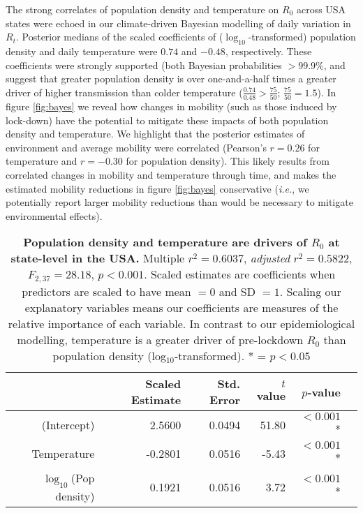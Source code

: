 \documentclass[12pt,english,a4paper]{article}
\newcommand{\RO}{$R_0$\xspace}
\begin{document}
The strong correlates of population density and temperature on \RO across USA states were echoed in our climate-driven Bayesian modelling of daily variation in $R_t$. Posterior medians of the scaled coefficients of ($\log_{10}$-transformed) population density and daily temperature were $0.74$ and $-0.48$, respectively. These coefficients were strongly supported (both Bayesian probabilities $> 99.9\%$, and suggest that greater population density is over one-and-a-half times a greater driver of higher transmission than colder temperature ($\frac{0.74}{0.48} > \frac{75}{50}$; $\frac{75}{50} = 1.5$). 
In figure \ref{fig:bayes} we reveal how changes in mobility (such as those induced by lock-down) have the potential to mitigate these impacts of both population density and temperature.
We highlight that the posterior estimates of environment and average mobility were correlated (Pearson's $r = 0.26$ for temperature and $r = -0.30$ for population density). 
This likely results from correlated changes in mobility and temperature through time, and makes the estimated mobility reductions in figure \ref{fig:bayes} conservative (\emph{i.e.}, we potentially report larger mobility reductions than would be necessary to mitigate environmental effects).



\begin{table}[ht]
\centering
\caption{\textbf{Population density and temperature are drivers of \RO at state-level in the USA.} Multiple $r^2 = 0.6037$, \textsl{adjusted} $r^2 = 0.5822$, $F_{2,37} = 28.18$, $p < 0.001$. Scaled estimates are coefficients when predictors are scaled to have mean $= 0$ and SD $= 1$. Scaling our explanatory variables means our coefficients are measures of the relative importance of each variable. In contrast to our epidemiological modelling, temperature is a greater driver of pre-lockdown \RO than population density (log$_{10}$-transformed). * = $p < 0.05$}
\begin{tabular}{rrrrrr}
  \hline
 & Scaled Estimate & Std. Error &  $t$ value & $p$-value \\ 
  \hline
  (Intercept) & 2.5600 & 0.0494 & 51.80 & $<0.001$* \\ 
  Temperature & -0.2801 & 0.0516 & -5.43 & $<0.001$* \\ 
  $\log_{10}$(Pop density) & 0.1921 & 0.0516 & 3.72 & $<0.001$*  \\ 
   \hline
\end{tabular}
\label{tab:regression}
\end{table}
\end{document}
